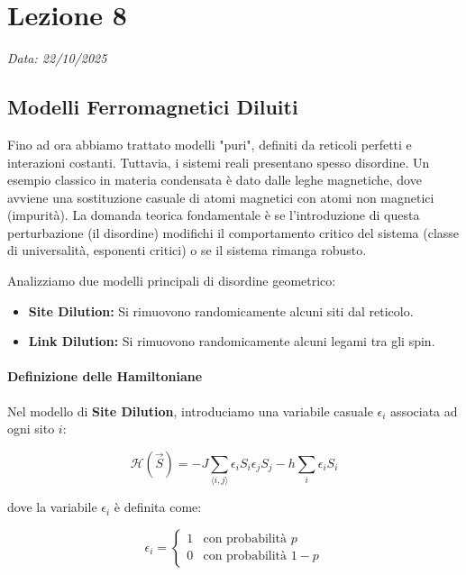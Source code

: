 \chapter{Lezione 8}
\label{chap:lezione_08}

\begin{flushright}
\textit{Data: 22/10/2025}
\end{flushright}

\section{Modelli Ferromagnetici Diluiti}

Fino ad ora abbiamo trattato modelli "puri", definiti da reticoli perfetti e interazioni costanti. Tuttavia, i sistemi reali presentano spesso disordine. Un esempio classico in materia condensata è dato dalle leghe magnetiche, dove avviene una sostituzione casuale di atomi magnetici con atomi non magnetici (impurità).
La domanda teorica fondamentale è se l'introduzione di questa perturbazione (il disordine) modifichi il comportamento critico del sistema (classe di universalità, esponenti critici) o se il sistema rimanga robusto.

\noindent Analizziamo due modelli principali di disordine geometrico:
\begin{itemize}
    \item \textbf{Site Dilution:} Si rimuovono randomicamente alcuni siti dal reticolo.
    \item \textbf{Link Dilution:} Si rimuovono randomicamente alcuni legami tra gli spin.
\end{itemize}

\subsubsection{Definizione delle Hamiltoniane}



Nel modello di \textbf{Site Dilution}, introduciamo una variabile casuale $\epsilon_i$ associata ad ogni sito $i$:

\begin{equation}
\mathcal{H}(\vec{S}) = -J \sum_{\langle i,j \rangle} \epsilon_i S_i \epsilon_j S_j - h \sum_i \epsilon_i S_i
\end{equation}

\noindent dove la variabile $\epsilon_i$ è definita come:

\begin{equation}
\epsilon_i = 
\begin{cases} 
1 & \text{con probabilità } p \\
0 & \text{con probabilità } 1-p 
\end{cases}
\end{equation}

